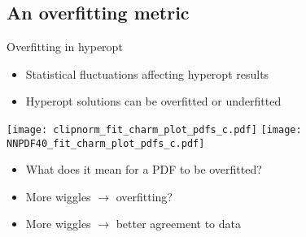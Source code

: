
\subsection{An overfitting metric}


\begin{frame}[t]{Overfitting in hyperopt}

  \begin{itemize}
    \item Statistical fluctuations affecting hyperopt results
    \item Hyperopt solutions can be overfitted or underfitted
  \end{itemize}

  \begin{center}
    \texttt{[image: clipnorm\_fit\_charm\_plot\_pdfs\_c.pdf]}
    \vspace*{0.3cm}
    \texttt{[image: NNPDF40\_fit\_charm\_plot\_pdfs\_c.pdf]}
  \end{center}

  \begin{itemize}
    \item What does it mean for a PDF to be overfitted?
    \item More wiggles $\to$ overfitting?
    \item More wiggles $\to$ better agreement to data
  \end{itemize}
\end{frame}


